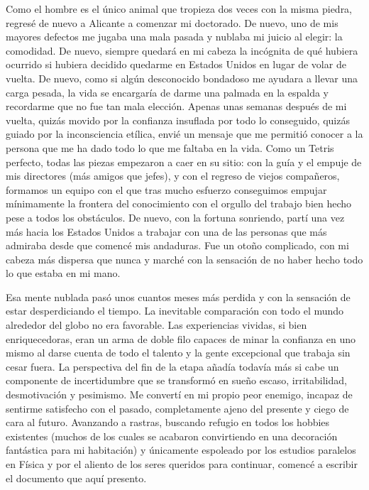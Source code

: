 Como el hombre es el único animal que tropieza dos veces con la misma piedra, regresé de nuevo a Alicante a comenzar mi doctorado. De nuevo, uno de mis mayores defectos me jugaba una mala pasada y nublaba mi juicio al elegir: la comodidad. De nuevo, siempre quedará en mi cabeza la incógnita de qué hubiera ocurrido si hubiera decidido quedarme en Estados Unidos en lugar de volar de vuelta. De nuevo, como si algún desconocido bondadoso me ayudara a llevar una carga pesada, la vida se encargaría de darme una palmada en la espalda y recordarme que no fue tan mala elección. Apenas unas semanas después de mi vuelta, quizás movido por la confianza insuflada por todo lo conseguido, quizás guiado por la inconsciencia etílica, envié un mensaje que me permitió conocer a la persona que me ha dado todo lo que me faltaba en la vida. Como un Tetris perfecto, todas las piezas empezaron a caer en su sitio: con la guía y el empuje de mis directores (más amigos que jefes), y con el regreso de viejos compañeros, formamos un equipo con el que tras mucho esfuerzo conseguimos empujar mínimamente la frontera del conocimiento con el orgullo del trabajo bien hecho pese a todos los obstáculos. De nuevo, con la fortuna sonriendo, partí una vez más hacia los Estados Unidos a trabajar con una de las personas que más admiraba desde que comencé mis andaduras. Fue un otoño complicado, con mi cabeza más dispersa que nunca y marché con la sensación de no haber hecho todo lo que estaba en mi mano.

Esa mente nublada pasó unos cuantos meses más perdida y con la sensación de estar desperdiciando el tiempo. La inevitable comparación con todo el mundo alrededor del globo no era favorable. Las experiencias vividas, si bien enriquecedoras, eran un arma de doble filo capaces de minar la confianza en uno mismo al darse cuenta de todo el talento y la gente excepcional que trabaja sin cesar fuera. La perspectiva del fin de la etapa añadía todavía más si cabe un componente de incertidumbre que se transformó en sueño escaso, irritabilidad, desmotivación y pesimismo. Me convertí en mi propio peor enemigo, incapaz de sentirme satisfecho con el pasado, completamente ajeno del presente y ciego de cara al futuro. Avanzando a rastras, buscando refugio en todos los hobbies existentes (muchos de los cuales se acabaron convirtiendo en una decoración fantástica para mi habitación) y únicamente espoleado por los estudios paralelos en Física y por el aliento de los seres queridos para continuar, comencé a escribir el documento que aquí presento.

